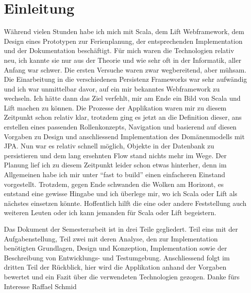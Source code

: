 \chapter*{Einleitung}
W\"ahrend vielen Stunden habe ich mich mit Scala, dem Lift Webframework, dem Design eines Prototypen zur Ferienplanung, der entsprechenden Implementation und der Dokumentation besch\"aftigt. F\"ur mich waren die Technologien relativ neu, ich kannte sie nur aus der Theorie und wie sehr oft in der Informatik, aller Anfang war schwer.  Die ersten Versuche waren zwar wegbereitend, aber m\"uhsam. Die Einarbeitung in die verschiedenen Persistenz Frameworks war sehr aufw\"andig und ich war unmittelbar davor, auf ein mir bekanntes Webframework zu wechseln. Ich h\"atte dann das Ziel verfehlt, mir am Ende ein Bild von Scala und Lift machen zu k\"onnen. Die Prozesse der Applikation waren mir zu diesem Zeitpunkt schon relativ klar, trotzdem ging es jetzt an die Definition dieser,  ans erstellen eines passenden Rollenkonzepts, Navigation und basierend auf diesen Vorgaben zu Design und anschliessend Implementation des Dom\"anenmodells mit JPA. Nun war es relativ schnell m\"oglich, Objekte in der Datenbank zu persistieren und dem lang ersehnten Flow stand nichts mehr im Wege. Der Planung lief ich zu diesem Zeitpunkt leider schon etwas hinterher, denn im Allgemeinen habe ich mir unter ``fast to build''\cite{liftweb} einen einfacheren Einstand vorgestellt. Trotzdem, gegen Ende schwanden die Wolken am Horizont, es entstand eine gewisse Hingabe und ich \"uberlege mir, wo ich Scala oder Lift als n\"achstes einsetzen k\"onnte. Hoffentlich hilft die eine oder andere Feststellung auch weiteren Leuten oder ich kann jemanden f\"ur Scala oder Lift begeistern.

Das Dokument der Semesterarbeit ist in drei Teile gegliedert. Teil eins mit der Aufgabenstellung, Teil zwei mit deren Analyse, den zur Implementation ben\"otigten Grundlagen, Design und Konzeption, Implementation sowie der Beschreibung von Entwicklungs- und Testumgebung. Anschliessend folgt im dritten Teil der R\"uckblick, hier wird die Applikation anhand der Vorgaben bewertet und ein Fazit \"uber die verwendeten Technologien gezogen. \newline\newline
Danke f\"urs Interesse\newline
Raffael Schmid